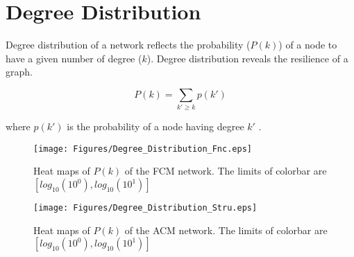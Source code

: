 \section{Degree Distribution}
Degree distribution of a network reflects the probability ($P(k)$) of a node to have a given number of degree ($k$). Degree distribution reveals the resilience of a graph. 

\begin{equation}
 P(k) = \sum\limits_{k' \geq k} p(k')
\end{equation}

where $p(k')$ is the probability of a node having degree $k'$ \citep{BAR99a}. 


\begin{figure}[htbp]
 
  \centering
	 \texttt{[image: Figures/Degree\_Distribution\_Fnc.eps]}
  \caption[Degree Distribution, FCM]{Heat maps of $P(k)$ of the FCM network. The limits of colorbar are $[log_{10}(10^0), log_{10}(10^1)]$} 
    \label{fig:Degree Distribution, FCM}
 	
\end{figure}



\begin{figure}[htbp]
 
  \centering
	 \texttt{[image: Figures/Degree\_Distribution\_Stru.eps]}
  \caption[Degree Distribution, ACM]{Heat maps of $P(k)$ of the ACM network. The limits of colorbar are $[log_{10}(10^0), log_{10}(10^1)]$} 
    \label{fig:Degree Distribution, ACM}
 	
\end{figure}



